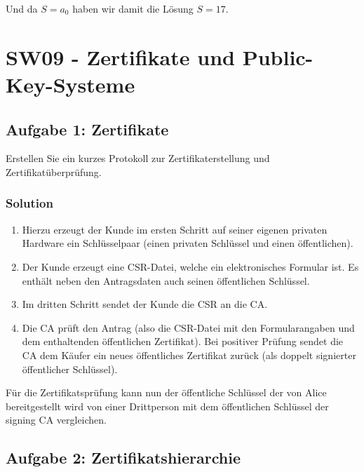 \documentclass[11pt]{article}
\providecommand{\tightlist}{%
      \setlength{\itemsep}{0pt}\setlength{\parskip}{0pt}}
\begin{document}
Und da \(S = a_0\) haben wir damit die Lösung \(S = 17\).

    

    \hypertarget{sw09---zertifikate-und-public-key-systeme}{%
\section{SW09 - Zertifikate und
Public-Key-Systeme}\label{sw09---zertifikate-und-public-key-systeme}}

    \hypertarget{aufgabe-1-zertifikate}{%
\subsection{Aufgabe 1: Zertifikate}\label{aufgabe-1-zertifikate}}

Erstellen Sie ein kurzes Protokoll zur Zertifikaterstellung und
Zertifikatüberprüfung.

\hypertarget{solution}{%
\subsubsection{Solution}\label{solution}}

\begin{enumerate}
\def\labelenumi{\arabic{enumi}.}
\tightlist
\item
  Hierzu erzeugt der Kunde im ersten Schritt auf seiner eigenen privaten
  Hardware ein Schlüsselpaar (einen privaten Schlüssel und einen
  öffentlichen).
\item
  Der Kunde erzeugt eine CSR-Datei, welche ein elektronisches Formular
  ist. Es enthält neben den Antragsdaten auch seinen öffentlichen
  Schlüssel.
\item
  Im dritten Schritt sendet der Kunde die CSR an die CA.
\item
  Die CA prüft den Antrag (also die CSR-Datei mit den Formularangaben
  und dem enthaltenden öffentlichen Zertifikat). Bei positiver Prüfung
  sendet die CA dem Käufer ein neues öffentliches Zertifikat zurück (als
  doppelt signierter öffentlicher Schlüssel).
\end{enumerate}

Für die Zertifikatsprüfung kann nun der öffentliche Schlüssel der von
Alice bereitgestellt wird von einer Drittperson mit dem öffentlichen
Schlüssel der signing CA vergleichen.

    \hypertarget{aufgabe-2-zertifikatshierarchie}{%
\subsection{Aufgabe 2:
Zertifikatshierarchie}\label{aufgabe-2-zertifikatshierarchie}}
\end{document}
